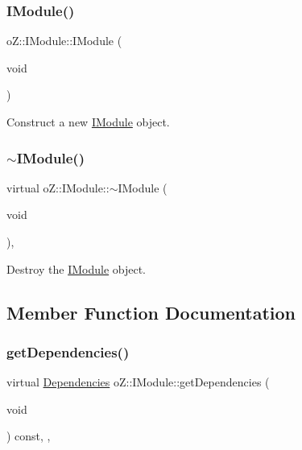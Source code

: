 \subsubsection{\texorpdfstring{IModule()}{IModule()}}
{\footnotesize\ttfamily o\+Z\+::\+I\+Module\+::\+I\+Module (\begin{DoxyParamCaption}\item[{void}]{ }\end{DoxyParamCaption})\hspace{0.3cm}{\ttfamily [default]}}



Construct a new \mbox{\hyperlink{classo_z_1_1_i_module}{I\+Module}} object. 

\mbox{\label{classo_z_1_1_i_module_a6ac6f3edf9fe885b2510dc01379a951c}} 
\subsubsection{\texorpdfstring{$\sim$IModule()}{~IModule()}}
{\footnotesize\ttfamily virtual o\+Z\+::\+I\+Module\+::$\sim$\+I\+Module (\begin{DoxyParamCaption}\item[{void}]{ }\end{DoxyParamCaption})\hspace{0.3cm}{\ttfamily [virtual]}, {\ttfamily [default]}}



Destroy the \mbox{\hyperlink{classo_z_1_1_i_module}{I\+Module}} object. 



\subsection{Member Function Documentation}
\mbox{\label{classo_z_1_1_i_module_a720a329e6ebcbecbc150d8b0bbee6e37}} 
\subsubsection{\texorpdfstring{getDependencies()}{getDependencies()}}
{\footnotesize\ttfamily virtual \mbox{\hyperlink{classo_z_1_1_i_module_ac13210556cb2a65d186bfbe5208c666c}{Dependencies}} o\+Z\+::\+I\+Module\+::get\+Dependencies (\begin{DoxyParamCaption}\item[{void}]{ }\end{DoxyParamCaption}) const\hspace{0.3cm}{\ttfamily [inline]}, {\ttfamily [virtual]}, {\ttfamily [noexcept]}}



